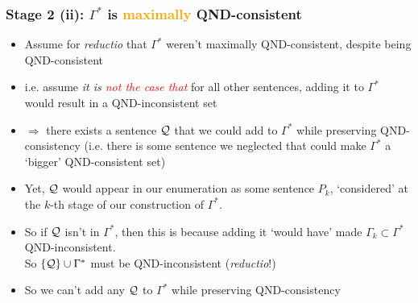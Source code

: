 \begin{frame}
\frametitle{Stage 2 (ii): $\Gamma^{\ast}$ is \textcolor{orange}{maximally} QND-consistent}

\begin{itemize}


\item Assume for \textit{reductio} that $\Gamma^{\ast}$ weren't maximally QND-consistent, despite being QND-consistent

\item i.e. assume \textit{it is \textcolor{red}{not the case that}} for all other sentences, adding it to $\Gamma^{\ast}$ would result in a \textcolor{OGlyallpink}{QND-inconsistent} set


\item[] $\Rightarrow$ there exists a sentence $\mathcal{Q}$ that we could add to $\Gamma^{\ast}$ while preserving \alert{QND-consistency} (i.e. there is some sentence we neglected that could make $\Gamma^{\ast}$ a `bigger' QND-consistent set)

\item Yet, $\mathcal{Q}$ would appear in our enumeration as some sentence $P_k$, `considered' at the $k$-th stage of our construction of $\Gamma^{\ast}$.

\item So if $\mathcal{Q}$ isn't in $\Gamma^{\ast}$, then this is because adding it `would have' made $\Gamma_k \subset \Gamma^{\ast}$ \textcolor{OGlyallpink}{QND-inconsistent}. \\ So $\{\mathcal{Q}\} \cup \Gamma^{\ast}$ must be QND-inconsistent (\textit{reductio}!)






\item So we can't add any $\mathcal{Q}$ to $\Gamma^{\ast}$ while preserving QND-consistency 


\end{itemize}
\end{frame}


